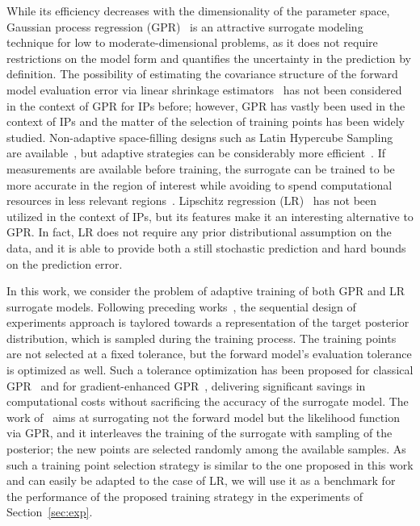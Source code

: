 While its efficiency decreases with the dimensionality of the parameter space, Gaussian process regression (GPR)~\cite{RasmussenWilliams2006} is an attractive surrogate modeling technique for low to moderate-dimensional problems, as it does not require restrictions on the model form and quantifies the uncertainty in the prediction by definition.
The possibility of estimating the covariance structure of the forward model evaluation error via linear shrinkage estimators~\cite{LedoitWolf2004b} has not been considered in the context of GPR for IPs before; however, GPR has vastly been used in the context of IPs and the matter of the selection of training points has been widely studied.
Non-adaptive space-filling designs such as Latin Hypercube Sampling~\cite{McKayBeckmanConover1979} are available~\cite{Giunta}, but adaptive strategies can be considerably more efficient~\cite{Crombecq}.
If measurements are available before training, the surrogate can be trained to be more accurate in the region of interest while avoiding to spend computational resources in less relevant regions~\cite{SinsbeckNowak2017, WangBroccardo2020}.
Lipschitz regression (LR)~\cite{ZabinskySmithKristinsdottir2003,Calliess2017} has not been utilized in the context of IPs, but its features make it an interesting alternative to GPR.
In fact, LR does not require any prior distributional assumption on the data, and it is able to provide both a still stochastic prediction and hard bounds on the prediction error.\medskip

In this work, we consider the problem of adaptive training of both GPR and LR surrogate models.
Following preceding works~\cite{VillaniUngerWeiser2024,VillaniArconesUngerWeiser2025}, the sequential design of experiments approach is taylored towards a representation of the target posterior distribution, which is sampled during the training process. 
The training points are not selected at a fixed tolerance, but the forward model's evaluation tolerance is optimized as well. 
Such a tolerance optimization has been proposed for classical GPR~\cite{SemlerWeiser2023} and for gradient-enhanced GPR~\cite{SemlerWeiser2024}, delivering significant savings in computational costs without sacrificing the accuracy of the surrogate model.
The work of~\cite{Dinkel2024} aims at surrogating not the forward model but the likelihood function via GPR, and it interleaves the training of the surrogate with sampling of the posterior; the new points are selected randomly among the available samples. 
As such a training point selection strategy is similar to the one proposed in this work and can easily be adapted to the case of LR, we will use it as a benchmark for the performance of the proposed training strategy in the experiments of Section~\ref{sec:exp}.